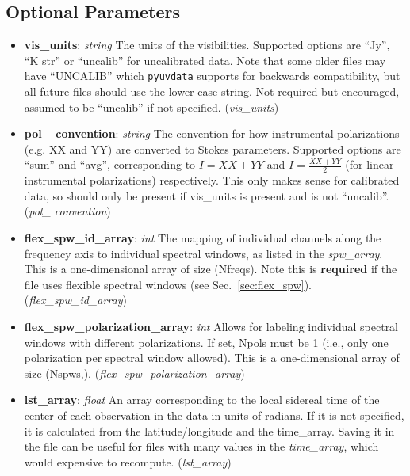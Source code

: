 \documentclass[11pt, oneside]{article}
\begin{document}
\subsection{Optional Parameters}
\label{sec:opt_params}
\begin{itemize}
\item \textbf{vis\_units}: \textit{string}  The units of the visibilities.
  Supported options are ``Jy'', ``K str'' or ``uncalib'' for uncalibrated data.
  Note that some older files may have ``UNCALIB'' which \texttt{pyuvdata} supports
  for backwards compatibility, but all future files should use the lower case string.
  Not required but encouraged, assumed to be ``uncalib'' if not specified.
  (\textit{vis\_units})
\item \textbf{pol\_ convention}: \textit{string}  
  The convention for how instrumental polarizations (e.g. XX and YY) are converted
  to Stokes parameters. Supported options are ``sum'' and ``avg'', corresponding to
  $I=XX+YY$ and $I=\frac{XX+YY}{2}$ (for linear instrumental polarizations) respectively.
  This only makes sense for calibrated data, so should only be present if vis\_units
  is present and is not ``uncalib''.  (\textit{pol\_ convention})
\item \textbf{flex\_spw\_id\_array}: \textit{int} The mapping of individual
  channels along the frequency axis to individual spectral windows, as listed in
  the \textit{spw\_array}. This is a one-dimensional array of size
  (Nfreqs). Note this is \textbf{required} if the file uses flexible
  spectral windows (see Sec.~\ref{sec:flex_spw}). (\textit{flex\_spw\_id\_array})
\item \textbf{flex\_spw\_polarization\_array}: \textit{int} Allows for labeling individual
  spectral windows with different polarizations. If set, Npols must be 1 (i.e., only one
  polarization per spectral window allowed). This is a one-dimensional array of
  size (Nspws,). (\textit{flex\_spw\_polarization\_array})
\item \textbf{lst\_array}: \textit{float} An array corresponding to the local
  sidereal time of the center of each observation in the data in units of
  radians. If it is not specified, it is calculated from the latitude/longitude
  and the time\_array. Saving it in the file can be useful for files with many
  values in the \textit{time\_array}, which would expensive to
  recompute. (\textit{lst\_array})


\end{itemize}
\end{document}
